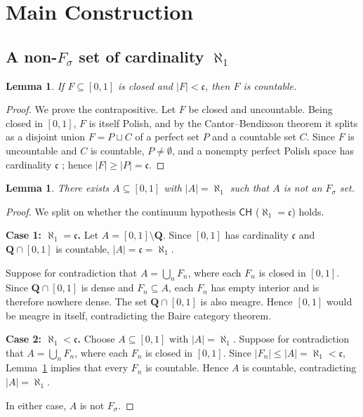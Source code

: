 \documentclass[12pt]{article}
\newtheorem{lemma}[theorem]{Lemma}
\theoremstyle{definition}
\newcommand{\Fsigma}{F_{\!\sigma}}
\newcommand{\Cont}{\mathfrak{c}}
\begin{document}
\section{Main Construction}
\label{sec:main}

\subsection{A non-$\Fsigma$ set of cardinality $\aleph_1$}
\label{subsec:A}

\begin{lemma}
  \label{lem:closed-card}
  If $F \subseteq [0,1]$ is closed and $\lvert F\rvert < \Cont$, then $F$
  is countable.
\end{lemma}
\begin{proof}
  We prove the contrapositive. Let $F$ be closed and uncountable. Being
  closed in $[0,1]$, $F$ is itself Polish, and by the Cantor--Bendixson
  theorem \cite[Theorem~6.4]{Kechris1995} it splits as a disjoint union
  $F = P \sqcup C$ of a perfect set $P$ and a countable set $C$. Since $F$
  is uncountable and $C$ is countable, $P \ne \emptyset$, and a nonempty
  perfect Polish space has cardinality $\Cont$
  \cite[Theorem~6.2, Corollary~6.3]{Kechris1995}; hence
  $\lvert F\rvert \ge \lvert P\rvert = \Cont$.
\end{proof}

\begin{lemma}
  \label{lem:A-exists}
  There exists $A \subseteq [0,1]$ with $\lvert A\rvert = \aleph_1$
  such that $A$ is not an $\Fsigma$ set.
\end{lemma}

\begin{proof}
  We split on whether the continuum hypothesis $\mathsf{CH}$
  ($\aleph_1 = \Cont$) holds.

  \medskip
  \noindent\textbf{Case 1: $\aleph_1=\Cont$.}
  Let $A=[0,1]\setminus\mathbf{Q}$. Since $[0,1]$ has cardinality $\Cont$
  and $\mathbf{Q}\cap[0,1]$ is countable, $|A|=\Cont=\aleph_1$.

  Suppose for contradiction that $A=\bigcup_n F_n$, where each $F_n$ is
  closed in $[0,1]$. Since $\mathbf{Q}\cap[0,1]$ is dense and $F_n\subseteq A$,
  each $F_n$ has empty interior and is therefore nowhere dense. The set
  $\mathbf{Q}\cap[0,1]$ is also meagre. Hence $[0,1]$ would be meagre in
  itself, contradicting the Baire category theorem.

  \medskip
  \noindent\textbf{Case 2: $\aleph_1<\Cont$.}
  Choose $A\subseteq[0,1]$ with $|A|=\aleph_1$. Suppose for contradiction
  that $A=\bigcup_n F_n$, where each $F_n$ is closed in $[0,1]$. Since
  $|F_n|\le|A|=\aleph_1<\Cont$, Lemma~\ref{lem:closed-card} implies that
  every $F_n$ is countable. Hence $A$ is countable, contradicting $|A|=\aleph_1$.

  In either case, $A$ is not $\Fsigma$.
\end{proof}
\end{document}
